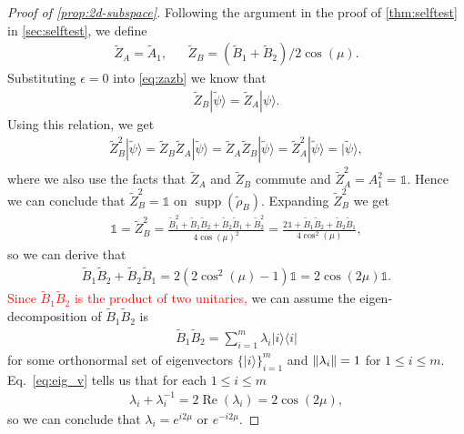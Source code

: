 \documentclass[11pt,letterpaper]{article}
\newcommand{\ket}[1]{|#1\rangle}
\newcommand{\ketbra}[2]{|#1\rangle\langle#2|}
\DeclarePairedDelimiter{\norm}{\lVert}{\rVert}
\renewcommand{\Re}{\operatorname{Re}}
\DeclareMathOperator{\spn}{span}
\DeclareMathOperator{\supp}{supp}
\newcommand{\1}{\mathbb{1}}
\newcommand{\tA}{\tilde{A}}
\newcommand{\tB}{\tilde{B}}
\newcommand{\tZ}{\tilde{Z}}
\newcommand{\tpsi}{\tilde{\psi}}
\newcommand{\hf}[1]{\textcolor{red}{#1}}
\theoremstyle{definition}
\begin{document}
\begin{proof}[Proof of \cref{prop:2d-subspace}]
	Following the argument in the proof of \cref{thm:selftest} in \cref{sec:selftest}, we define
	\begin{align*}	
	\tilde{Z}_A = \tA_1, &&
	\tilde{Z}_B = (\tB_1+\tB_2)/2\cos(\mu).
	\end{align*}
	Substituting $\epsilon = 0$ into \cref{eq:zazb} we know that 
	\begin{align}
		\tZ_B \ket{\tpsi} = \tZ_A \ket{\psi}.
	\end{align}
	Using this relation, we get
	\begin{align}
		\tZ_B^2\ket{\tpsi} = \tZ_B \tZ_A\ket{\tpsi} = \tZ_A \tZ_B \ket{\tpsi} = \tZ_A^2 \ket{\tpsi} = \ket{\tpsi},
	\end{align}
	where we also use the facts that $\tZ_A$ and $\tZ_B$ commute and $\tZ_A^2 = A_1^2 = \1$.
	Hence we can conclude that $\tZ_B^2 =\1$ on $\supp(\tilde{\rho}_B)$.
	Expanding $\tilde{Z}_B^2$ we get
	\begin{align*}
		\1 = \tilde{Z}_B^2 = \frac{\tB_1^2 + \tB_1\tB_2 + \tB_2\tB_1 + \tB_2^2}{4\cos(\mu)^2}
		=\frac{2\1 + \tB_1\tB_2 + \tB_2\tB_1}{4\cos^2(\mu)},
	\end{align*}
	so we can derive that 
	\begin{align}
	\label{eq:eig_v}
		\tB_1\tB_2 + \tB_2\tB_1 = 2(2\cos^2(\mu)-1)\1 = 2 \cos(2\mu) \1.
	\end{align}
	\hf{Since $\tB_1\tB_2$ is the product of two unitaries,}
	we can assume the eigen-decomposition of $\tB_1\tB_2$ is
	\begin{align}
		\tB_1\tB_2 = \sum_{i=1}^m \lambda_i \ketbra{i}{i}
	\end{align}
	for some orthonormal set of eigenvectors $\{ \ket{i} \}_{i=1}^m$
	and $\norm{\lambda_i} =1$ for $1 \leq i \leq m$.
	Eq.~\ref{eq:eig_v} tells us that for each $1 \leq i \leq m$
	\begin{align*}
		\lambda_i + \lambda_i^{-1} = 2\Re(\lambda_i) = 2 \cos(2\mu),
	\end{align*}
	so we can conclude that $\lambda_i = e^{i 2\mu}$ or $e^{-i 2\mu}$.	

\end{proof}
\end{document}
